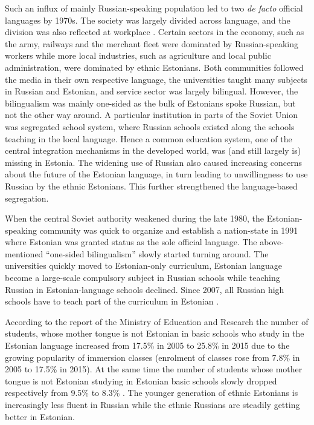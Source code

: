 \documentclass[12pt, a4paper]{article}
\begin{document}
Such an influx of mainly
Russian-speaking population
led to two \emph{de facto} official languages
by 1970s.
The society was largely divided across language, and the division was
also reflected at workplace \citep{leppik+vihalemm2015JofBaltStud}.
Certain sectors in the economy, such as the army, railways and the
merchant fleet
were dominated by
Russian-speaking workers while more local industries,
such as agriculture and
local public administration,
were dominated by ethnic Estonians.
Both communities followed the media in their own respective language, the
universities taught many subjects in Russian and Estonian,
and service sector was largely bilingual.  However, the bilingualism
was mainly one-sided as the bulk of Estonians spoke Russian, but not
the other way around.  A particular institution in parts of the Soviet
Union was segregated school system, where Russian schools existed along the
schools teaching in the local language.  Hence a common education
system, one of the central integration mechanisms in the developed world,
was (and still largely is) missing in Estonia.
The widening use of Russian also
caused increasing concerns about the future of the Estonian
language, in turn leading to  unwillingness to use Russian by
the ethnic Estonians.  This further strengthened the language-based segregation.

When the central Soviet authority weakened during the late 1980, the
Estonian-speaking community was quick to organize and establish a
nation-state in 1991 where
Estonian was granted status as the sole official language.  The
above-mentioned ``one-sided bilingualism'' slowly started turning
around.  The universities quickly moved to Estonian-only curriculum,
Estonian language become a large-scale compulsory subject in Russian
schools while teaching Russian in Estonian-language schools declined.
Since 2007, all Russian high schools have to teach part of the
curriculum in Estonian \citep{lindemann+saar2011Russian2ndGeneration}.

According to the report of the Ministry of Education and Research the number
of students, whose mother tongue is not Estonian in basic schools who study in the Estonian language increased from 17.5\% in 2005 to 25.8\% in 2015 due to the growing popularity of immersion
classes (enrolment of classes rose from 7.8\% in 2005 to 17.5\% in 2015).
At the same time the number of students whose mother tongue is not
Estonian studying in Estonian basic schools slowly dropped
respectively from 9.5\% to  8.3\% \citep{HTM2015}.  The younger generation of ethnic Estonians is
increasingly less fluent in Russian while the ethnic Russians are
steadily getting better in Estonian.
\end{document}
